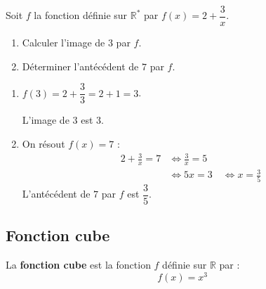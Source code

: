 \begin{methode}
	Soit $f$ la fonction définie sur $\mathbb{R}^*$ par $f(x) = 2 + \dfrac{3}{x}$.
	\begin{enumerate}
		\item Calculer l'image de $3$ par $f$.
		\item Déterminer l'antécédent de $7$ par $f$.
	\end{enumerate}

	\begin{correction}
		\nline
		\begin{enumerate}
			\item $f(3) = 2 + \dfrac{3}{3} = 2 + 1 = 3$.

			      L'image de $3$ est $3$.
			\item On résout $f(x) = 7$ :
			      \begin{align*}
				      2 + \frac{3}{x} = 7 & \iff \frac{3}{x} = 5                   \\
				                          & \iff 5x = 3 \quad \iff x = \frac{3}{5}
			      \end{align*}
			      L'antécédent de $7$ par $f$ est $\dfrac{3}{5}$.
		\end{enumerate}
	\end{correction}
\end{methode}

\newpage

\subsection{Fonction cube}

\begin{defin}
	La \textbf{fonction cube} est la fonction $f$ définie sur $\mathbb{R}$ par :
	\[
		f(x) = x^3
	\]
\end{defin}

